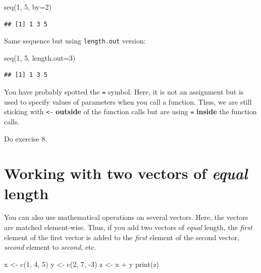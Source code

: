 \documentclass[
]{book}
\newenvironment{Shaded}{\begin{snugshade}}{\end{snugshade}}
\newcommand{\AttributeTok}[1]{\textcolor[rgb]{0.77,0.63,0.00}{#1}}
\newcommand{\DecValTok}[1]{\textcolor[rgb]{0.00,0.00,0.81}{#1}}
\newcommand{\FunctionTok}[1]{\textcolor[rgb]{0.00,0.00,0.00}{#1}}
\newcommand{\NormalTok}[1]{#1}
\newcommand{\OtherTok}[1]{\textcolor[rgb]{0.56,0.35,0.01}{#1}}
\newcommand{\SpecialCharTok}[1]{\textcolor[rgb]{0.00,0.00,0.00}{#1}}
\begin{document}
\begin{Shaded}
\begin{Highlighting}[]
\FunctionTok{seq}\NormalTok{(}\DecValTok{1}\NormalTok{, }\DecValTok{5}\NormalTok{, }\AttributeTok{by=}\DecValTok{2}\NormalTok{)}
\end{Highlighting}
\end{Shaded}

\begin{verbatim}
## [1] 1 3 5
\end{verbatim}

Same sequence but using \texttt{length.out} version:

\begin{Shaded}
\begin{Highlighting}[]
\FunctionTok{seq}\NormalTok{(}\DecValTok{1}\NormalTok{, }\DecValTok{5}\NormalTok{, }\AttributeTok{length.out=}\DecValTok{3}\NormalTok{)}
\end{Highlighting}
\end{Shaded}

\begin{verbatim}
## [1] 1 3 5
\end{verbatim}

You have probably spotted the \texttt{=} symbol. Here, it is not an assignment but is used to specify values of parameters when you call a function. Thus, we are still sticking with \texttt{\textless{}-} \textbf{outside} of the function calls but are using \texttt{=} \textbf{inside} the function calls.

Do exercise 8.

\hypertarget{working-with-two-vectors-of-equal-length}{%
\section{\texorpdfstring{Working with two vectors of \emph{equal} length}{Working with two vectors of equal length}}\label{working-with-two-vectors-of-equal-length}}

You can also use mathematical operations on several vectors. Here, the vectors are matched element-wise. Thus, if you add two vectors of \emph{equal} length, the \emph{first} element of the first vector is added to the \emph{first} element of the second vector, \emph{second} element to \emph{second}, etc.

\begin{Shaded}
\begin{Highlighting}[]
\NormalTok{x }\OtherTok{\textless{}{-}} \FunctionTok{c}\NormalTok{(}\DecValTok{1}\NormalTok{, }\DecValTok{4}\NormalTok{, }\DecValTok{5}\NormalTok{)}
\NormalTok{y }\OtherTok{\textless{}{-}} \FunctionTok{c}\NormalTok{(}\DecValTok{2}\NormalTok{, }\DecValTok{7}\NormalTok{, }\SpecialCharTok{{-}}\DecValTok{3}\NormalTok{)}
\NormalTok{z }\OtherTok{\textless{}{-}}\NormalTok{ x }\SpecialCharTok{+}\NormalTok{ y}
\FunctionTok{print}\NormalTok{(z)}
\end{Highlighting}
\end{Shaded}
\end{document}
